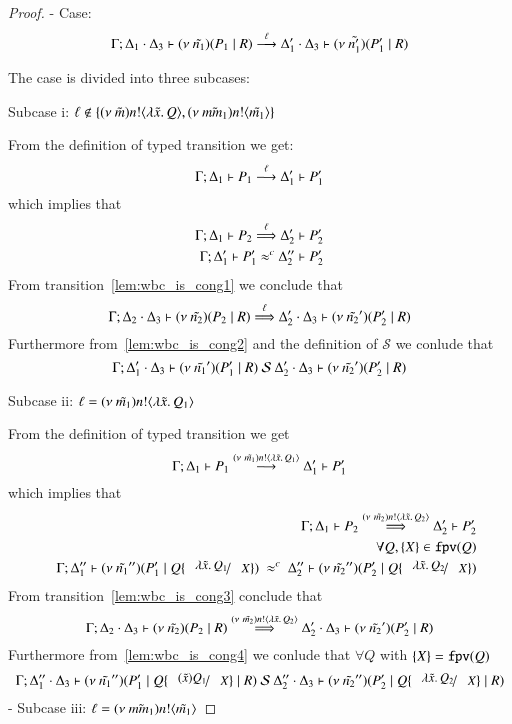 \begin{proof}

	\noi - Case: 
	\[
		\Gamma; \Delta_1 \cdot \Delta_3 \vdash (\nu\ \tilde{n_1})(P_1 \;|\; R) \stackrel{\ell}{\longrightarrow} \Delta_1' \cdot \Delta_3 \vdash (\nu\ \tilde{n_1'})(P_1' \;|\; R)
	\]

	\noi The case is divided into three subcases:

	\noi Subcase i: $\ell \notin \{(\nu\ \tilde{m}) n ! \langle \lambda \tilde{x}.\,Q \rangle, (\nu\ \tilde{mm_1}) n ! \langle \tilde{m_1} \rangle\}$

	\noi From the definition of typed transition we get:
	\[
		\Gamma; \Delta_1 \vdash P_1 \stackrel{\ell}{\longrightarrow} \Delta_1' \vdash P_1'
	\]
	\noi which implies that
%
	\begin{eqnarray}
		\Gamma; \Delta_1 \vdash P_2 \stackrel{\ell}{\Longrightarrow} \Delta_2' \vdash P_2'
		\label{lem:wbc_is_cong1}\\
		\Gamma; \Delta_1' \vdash P_1' \approx^{c} \Delta_2'' \vdash P_2'
		\label{lem:wbc_is_cong2}
	\end{eqnarray}
%
	\noi From transition~\ref{lem:wbc_is_cong1} we conclude that 
	\[
		\Gamma; \Delta_2 \cdot \Delta_3 \vdash (\nu\ \tilde{n_2})(P_2 \;|\; R) \stackrel{\ell}{\Longrightarrow} \Delta_2' \cdot \Delta_3 \vdash (\nu\ \tilde{n_2}')(P_2' \;|\; R)
	\]
%
	\noi Furthermore from~\ref{lem:wbc_is_cong2} and the definition of $\mathcal{S}$ we conlude that
	\[
		\Gamma; \Delta_1' \cdot \Delta_3 \vdash (\nu\ \tilde{n_1}')(P_1' \;|\; R) \ \mathcal{S}\  \Delta_2' \cdot \Delta_3 \vdash (\nu\ \tilde{n_2}')(P_2' \;|\; R)
	\]

	\noi Subcase ii: $\ell = (\nu\ \tilde{m_1}) n ! \langle \lambda \tilde{x}.\,Q_1 \rangle$

	\noi From the definition of typed transition we get
	\[
		\Gamma; \Delta_1 \vdash P_1 \stackrel{(\nu\ \tilde{m_1}) n ! \langle \lambda \tilde{x}.\,Q_1 \rangle}{\longrightarrow} \Delta_1' \vdash P_1'
	\]
	\noi which implies that
%
	\begin{eqnarray}
		&& \horel{\Gamma}{\Delta_1}{P_2}{\By{\news{\tilde{m_2}} \bactout{n}{\abs{\tilde{x}}{Q_2}}}}{\Delta_2'}{P_2'}
		\label{lem:wbc_is_cong3} \\
		&&\forall Q, \set{X} \in \fpv{Q} \nonumber \\
		&& \horel{\Gamma}{\Delta_1''}{\newsp{\tilde{n_1}''}{P_1' \Par Q \subst{\abs{\tilde{x}}{Q_1}}{X}}}
		{\ \wbc\ }
		{\Delta_2''}{\newsp{\tilde{n_2}''}{P_2' \Par Q \subst{\abs{\tilde{x}}{Q_2}}{X}}}
		\label{lem:wbc_is_cong4}
	\end{eqnarray}
%
	\noi From transition~\ref{lem:wbc_is_cong3} conclude that 
	\[
		\Gamma; \Delta_2 \cdot \Delta_3 \vdash (\nu\ \tilde{n_2})(P_2 \;|\; R) \stackrel{(\nu\ \tilde{m_2}) n ! \langle \lambda \tilde{x}.\,Q_2 \rangle}{\Longrightarrow} \Delta_2' \cdot \Delta_3 \vdash (\nu\ \tilde{n_2}')(P_2' \;|\; R)
	\]
%
	\noi Furthermore from~\ref{lem:wbc_is_cong4} we conlude that $\forall Q$ with $\{X\} = \mathtt{fpv}(Q)$
%
	\[
		\horel{\Gamma}{\Delta_1'' \cat \Delta_3}{\newsp{\tilde{n_1}''}{P_1' \Par Q \subst{(\tilde{x}) Q_1}{X} \Par R}}{\ \mathcal{S}\ }{\Delta_2'' \cat \Delta_3}{\newsp{\tilde{n_2}''}{P_2' \Par Q \subst{\abs{\tilde{x}}{Q_2}}{X} \Par R}}
	\]
%
	- Subcase iii: $\ell = (\nu\ \tilde{mm_1}) n ! \langle \tilde{m_1} \rangle$


\end{proof}
